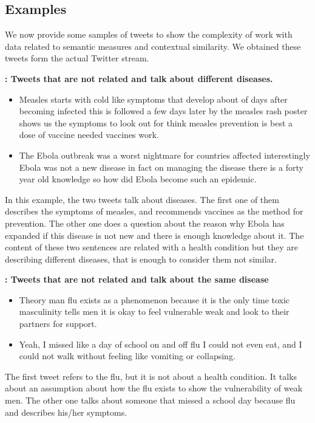 \documentclass[12pt]{report}
\begin{document}

\subsection{Examples}
We now provide some samples of tweets to show the complexity of work with data related to semantic measures and contextual similarity.
We obtained these tweets form the actual Twitter stream.

\begin{definition} {\bf : Tweets that are not related  and talk about different diseases.}
	\begin{itemize}[nolistsep]
		\item Measles starts with cold like symptoms that develop about of days after becoming infected this is followed a few days later by the measles rash poster shows us the symptoms to look out for think measles prevention is best a dose of vaccine needed vaccines work.
		\item The Ebola outbreak was a worst nightmare for countries affected interestingly Ebola was not a new disease in fact on managing the disease there is a forty year old knowledge so how did Ebola become such an epidemic.
	\end{itemize}
\end{definition}
In this example, the two tweets talk about diseases. The first one of them describes the symptoms of measles, and recommends vaccines as the method
for  prevention. The other one does a question about the reason why Ebola has expanded if this disease is not new and there is enough knowledge about it.  The content of these two sentences are related with a health condition but they are describing different diseases, that is enough to consider them not similar.

\begin{definition} {\bf : Tweets that are not related  and talk about the same disease}
	\begin{itemize}[nolistsep]
		\item Theory man flu exists as a phenomenon because it is the only time toxic masculinity tells men it is okay to feel vulnerable weak and look to their partners for support.
		\item Yeah, I missed like a day of school on and off flu I could not even eat, and I could not walk without feeling like vomiting or collapsing.
	\end{itemize}
\end{definition}
The first tweet refers to the flu, but it is not about a health condition. It talks about  an assumption about how the flu exists to show the vulnerability of weak  men. The  other one talks about someone that missed a school day because flu and describes  his/her symptoms.
\end{document}
